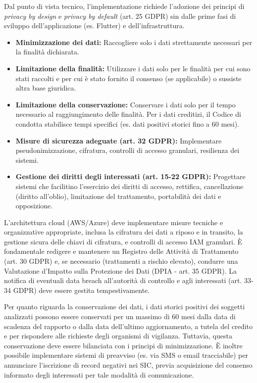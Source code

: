 Dal punto di vista tecnico, l'implementazione richiede l'adozione dei principi di \textit{privacy by design} e \textit{privacy by default} (art. 25 GDPR) sin dalle prime fasi di sviluppo dell'applicazione (es. Flutter) e dell'infrastruttura.
\begin{itemize}
    \item \textbf{Minimizzazione dei dati:} Raccogliere solo i dati strettamente necessari per la finalità dichiarata.
    \item \textbf{Limitazione della finalità:} Utilizzare i dati solo per le finalità per cui sono stati raccolti e per cui è stato fornito il consenso (se applicabile) o sussiste altra base giuridica.
    \item \textbf{Limitazione della conservazione:} Conservare i dati solo per il tempo necessario al raggiungimento delle finalità. Per i dati creditizi, il Codice di condotta stabilisce tempi specifici (es. dati positivi storici fino a 60 mesi).
    \item \textbf{Misure di sicurezza adeguate (art. 32 GDPR):} Implementare pseudonimizzazione, cifratura, controlli di accesso granulari, resilienza dei sistemi.
    \item \textbf{Gestione dei diritti degli interessati (art. 15-22 GDPR):} Progettare sistemi che facilitino l'esercizio dei diritti di accesso, rettifica, cancellazione (diritto all'oblio), limitazione del trattamento, portabilità dei dati e opposizione.
\end{itemize}
L'architettura cloud (AWS/Azure) deve implementare misure tecniche e organizzative appropriate, inclusa la cifratura dei dati a riposo e in transito, la gestione sicura delle chiavi di cifratura, e controlli di accesso IAM granulari. È fondamentale redigere e mantenere un Registro delle Attività di Trattamento (art. 30 GDPR) e, se necessario (trattamenti a rischio elevato), condurre una Valutazione d'Impatto sulla Protezione dei Dati (DPIA - art. 35 GDPR). La notifica di eventuali data breach all'autorità di controllo e agli interessati (art. 33-34 GDPR) deve essere gestita tempestivamente.

Per quanto riguarda la conservazione dei dati, i dati storici positivi dei soggetti analizzati possono essere conservati per un massimo di 60 mesi dalla data di scadenza del rapporto o dalla data dell'ultimo aggiornamento, a tutela del credito e per rispondere alle richieste degli organismi di vigilanza. Tuttavia, questa conservazione deve essere bilanciata con i principi di minimizzazione. È inoltre possibile implementare sistemi di preavviso (es. via SMS o email tracciabile) per annunciare l'iscrizione di record negativi nei SIC, previa acquisizione del consenso informato degli interessati per tale modalità di comunicazione.

